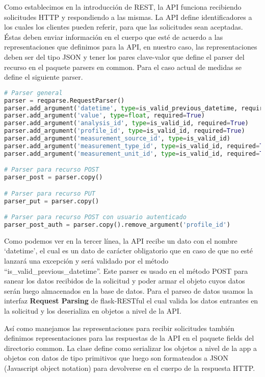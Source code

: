 Como establecimos en la introducción de REST, la API funciona recibiendo solicitudes HTTP y respondiendo a las mismas. La API define identificadores a los cuales los clientes pueden referir, para que las solicitudes sean aceptadas. Éstas deben enviar información en el cuerpo que esté de acuerdo a las representaciones que definimos para la API, en nuestro caso, las representaciones deben ser del tipo JSON y tener los pares clave-valor que define el parser del recurso en el paquete parsers en common. Para el caso actual de medidas se define el siguiente parser.

\begin{lstlisting}[language=Python]
# Parser general
parser = reqparse.RequestParser()
parser.add_argument('datetime', type=is_valid_previous_datetime, required=True)
parser.add_argument('value', type=float, required=True)
parser.add_argument('analysis_id', type=is_valid_id, required=True)
parser.add_argument('profile_id', type=is_valid_id, required=True)
parser.add_argument('measurement_source_id', type=is_valid_id)
parser.add_argument('measurement_type_id', type=is_valid_id, required=True)
parser.add_argument('measurement_unit_id', type=is_valid_id, required=True)

# Parser para recurso POST
parser_post = parser.copy()

# Parser para recurso PUT
parser_put = parser.copy()

# Parser para recurso POST con usuario autenticado
parser_post_auth = parser.copy().remove_argument('profile_id')
\end{lstlisting}

Como podemos ver en la tercer línea, la API recibe un dato con el nombre ‘datetime’, el cual es un dato de carácter obligatorio que en caso de que no esté lanzará una excepción y será validado  por el método ``is\_valid\_previous\_datetime''. Este parser es usado en el método POST para sanear los datos recibidos de la solicitud y poder armar el objeto cuyos datos serán luego almacenados en la base de datos. Para el parseo de datos usamos la interfaz \textbf{Request Parsing} de flask-RESTful el cual valida los datos entrantes en la solicitud y los deserializa en objetos a nivel de la API.

Así como manejamos las representaciones para recibir solicitudes también definimos representaciones para las respuestas de la API en el paquete fields del directorio common. La clase define como serializar los objetos a nivel de la app a objetos con datos de tipo primitivos que luego son formateados a JSON (Javascript object notation) para devolverse en el cuerpo de la respuesta HTTP.

